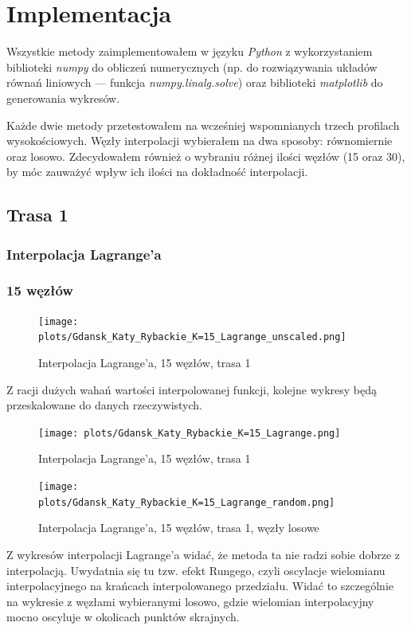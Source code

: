 \documentclass{article}
\begin{document}
\section{Implementacja}

Wszystkie metody zaimplementowałem w języku \textit{Python} z 
wykorzystaniem biblioteki \textit{numpy} do obliczeń numerycznych
(np. do rozwiązywania układów równań liniowych --- funkcja \textit{numpy.linalg.solve})
oraz biblioteki \textit{matplotlib}
do generowania wykresów.

Każde dwie metody przetestowałem na wcześniej wspomnianych trzech profilach wysokościowych.
Węzły interpolacji wybierałem na dwa sposoby: równomiernie oraz losowo.
Zdecydowałem również o wybraniu różnej ilości węzłów (15 oraz 30), by móc 
zauważyć wpływ ich ilości na dokładność interpolacji.

\subsection{Trasa 1}
\subsubsection{Interpolacja Lagrange'a}
\subsubsection*{\hfil 15 węzłów \hfil }

\begin{figure}[H]
    \centering
    \texttt{[image: plots/Gdansk\_Katy\_Rybackie\_K=15\_Lagrange\_unscaled.png]}
    \caption{Interpolacja Lagrange'a, 15 węzłów, trasa 1}
\end{figure}

Z racji dużych wahań wartości interpolowanej funkcji, kolejne wykresy będą przeskalowane
do danych rzeczywistych.


\begin{figure}[H]
    \centering
    \texttt{[image: plots/Gdansk\_Katy\_Rybackie\_K=15\_Lagrange.png]}
    \caption{Interpolacja Lagrange'a, 15 węzłów, trasa 1}
\end{figure}

\begin{figure}[H]
    \centering
    \texttt{[image: plots/Gdansk\_Katy\_Rybackie\_K=15\_Lagrange\_random.png]}
    \caption{Interpolacja Lagrange'a, 15 węzłów, trasa 1, węzły losowe}
\end{figure}

Z wykresów interpolacji Lagrange'a widać, że metoda ta nie radzi sobie dobrze z interpolacją.
Uwydatnia się tu tzw. efekt Rungego, czyli oscylacje wielomianu interpolacyjnego na krańcach interpolowanego
przedziału. Widać to szczególnie na wykresie z węzłami wybieranymi losowo, gdzie
wielomian interpolacyjny mocno oscyluje w okolicach punktów skrajnych.
\end{document}
